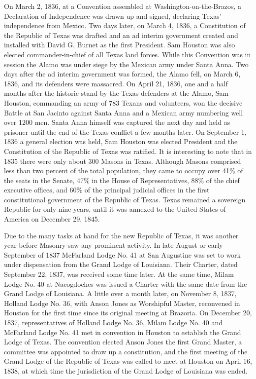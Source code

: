 \documentclass[letterpaper]{article}
\begin{document}
On March 2, 1836, at a Convention assembled at Washington-on-the-Brazos, a Declaration of
Independence was drawn up and signed, declaring Texas’ independence from Mexico. Two days
later, on March 4, 1836, a Constitution of the Republic of Texas was drafted and an ad interim
government created and installed with David G. Burnet as the first President. Sam Houston was
also elected commander-in-chief of all Texas land forces. While this Convention was in session the
Alamo was under siege by the Mexican army under Santa Anna. Two days after the ad interim
government was formed, the Alamo fell, on March 6, 1836, and its defenders were massacred. On
April 21, 1836, one and a half months after the historic stand by the Texas defenders at the Alamo,
Sam Houston, commanding an army of 783 Texans and volunteers, won the decisive Battle at San
Jacinto against Santa Anna and a Mexican army numbering well over 1200 men. Santa Anna
himself was captured the next day and held as prisoner until the end of the Texas conflict a few
months later. On September 1, 1836 a general election was held, Sam Houston was elected President
and the Constitution of the Republic of Texas was ratified. It is interesting to note that in 1835
there were only about 300 Masons in Texas. Although Masons comprised less than two percent of
the total population, they came to occupy over 41\% of the seats in the Senate, 47\% in the House of
Representatives, 88\% of the chief executive offices, and 60\% of the principal judicial offices in the
first constitutional government of the Republic of Texas. Texas remained a sovereign Republic for
only nine years, until it was annexed to the United States of America on December 29, 1845.

Due to the many tasks at hand for the new Republic of Texas, it was another year before Masonry
saw any prominent activity. In late August or early September of 1837 McFarland Lodge No.
41 at San Augustine was set to work under dispensation from the Grand Lodge of Louisiana.
Their Charter, dated September 22, 1837, was received some time later. At the same time, Milam
Lodge No. 40 at Nacogdoches was issued a Charter with the same date from the Grand Lodge of
Louisiana. A little over a month later, on November 8, 1837, Holland Lodge No. 36, with Anson
Jones as Worshipful Master, reconvened in Houston for the first time since its original meeting at
Brazoria. On December 20, 1837, representatives of Holland Lodge No. 36, Milam Lodge No. 40
and McFarland Lodge No. 41 met in convention in Houston to establish the Grand Lodge of Texas.
The convention elected Anson Jones the first Grand Master, a committee was appointed to draw
up a constitution, and the first meeting of the Grand Lodge of the Republic of Texas was called to
meet at Houston on April 16, 1838, at which time the jurisdiction of the Grand Lodge of Louisiana
was ended.
\end{document}
